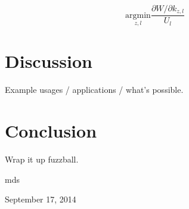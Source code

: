 \documentclass[journal]{IEEEtran}
\begin{document}
\begin{equation}
\underset{z,l}{\text{argmin}} \frac{\partial W/\partial k_{z,l}}{U_{l}} 
\end{equation}



\section{Discussion}

Example usages / applications / what's possible.



\section{Conclusion}

Wrap it up fuzzball.


\hfill mds
 
\hfill September 17, 2014





%
%

\end{document}
